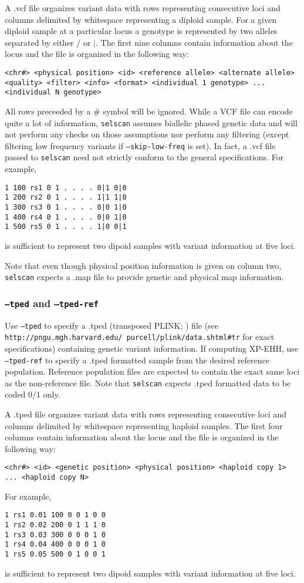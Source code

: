 \documentclass[12pt]{article}%
\begin{document}
A .vcf file organizes variant data with rows representing consecutive loci and columns delimited by whitespace representing a diploid sample.  For a given diploid sample at a particular locus a genotype is represented by two alleles separated by either $/$ or $|$.  The first nine columns contain information about the locus and the file is organized in the following way:
\begin{lstlisting}
<chr#> <physical position> <id> <reference allele> <alternate allele> <quality> <filter> <info> <format> <individual 1 genotype> ... <individual N genotype>  
\end{lstlisting}
All rows preceeded by a $\#$ symbol will be ignored. While a VCF file can encode quite a lot of information, {\tt selscan} assumes biallelic phased genetic data and will not perform any checks on those assumptions nor perform any filtering (except filtering low frequency variants if {\tt --skip-low-freq} is set). In fact, a .vcf file passed to {\tt selscan} need not strictly conform to the general specifications.  For example,
\begin{lstlisting}
1 100 rs1 0 1 . . . . 0|1 0|0
1 200 rs2 0 1 . . . . 1|1 1|0
1 300 rs3 0 1 . . . . 0|0 1|0
1 400 rs4 0 1 . . . . 0|0 1|0
1 500 rs5 0 1 . . . . 1|0 0|1
\end{lstlisting}
is sufficient to represent two dipoid samples with variant information at five loci.

Note that even though physical position information is given on column two, {\tt selscan} expects a .map file to provide genetic and physical map information.

\subsubsection{{\tt --tped} and {\tt --tped-ref}}

Use {\tt --tped} to specify a .tped (transposed PLINK; \cite{PurcellEtAl07}) file (see {\tt http://pngu.mgh.harvard.edu/~purcell/plink/data.shtml\#tr} for exact specifications) containing genetic variant information.  If computing XP-EHH, use {\tt --tped-ref} to specify a .tped formatted sample from the desired reference population.  Reference population files are expected to contain the exact same loci as the non-reference file.  Note that {\tt selscan} expects .tped formatted data to be coded $0/1$ only.

A .tped file organizes variant data with rows representing consecutive loci and columns delimited by whitespace representing haploid samples.  The first four columns contain information about the locus and the file is organized in the following way:
\begin{lstlisting}
<chr#> <id> <genetic position> <physical position> <haploid copy 1> ... <haploid copy N>  
\end{lstlisting}
For example,
\begin{lstlisting}
1 rs1 0.01 100 0 0 1 0 0
1 rs2 0.02 200 0 1 1 1 0
1 rs3 0.03 300 0 0 0 1 0
1 rs4 0.04 400 0 0 0 1 0
1 rs5 0.05 500 0 1 0 0 1
\end{lstlisting}
is sufficient to represent two dipoid samples with variant information at five loci.
\end{document}

